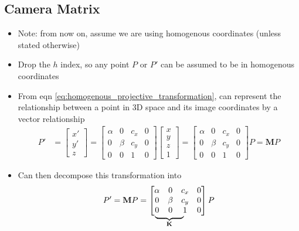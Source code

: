 \documentclass[letterpaper,12pt]{article}
\newcommand{\matr}[1]{\mathbf{#1}}
\newcommand\undermat[2]{%
  \makebox[0pt][l]{$\smash{\underbrace{\phantom{%
    \begin{matrix}#2\end{matrix}}}_{\text{$#1$}}}$}#2}
\begin{document}
\subsection{Camera Matrix}
\begin{itemize}
 \item Note: from now on, assume we are using homogenous coordinates (unless stated otherwise)
 \item Drop the $h$ index, so any point $P$ or $P'$ can be assumed to be in homogenous coordinates
 \item From eqn \ref{eq:homogenous_projective_transformation}, can represent the relationship between a point in 3D space and its image coordinates by a vector relationship
       \begin{align}
        P' & = \begin{bmatrix}
         x' \\
         y' \\
         z
        \end{bmatrix}
        = \begin{bmatrix}
         \alpha & 0     & c_x & 0 \\
         0      & \beta & c_y & 0 \\
         0      & 0     & 1   & 0
        \end{bmatrix}
        \begin{bmatrix}
         x \\
         y \\
         z \\
         1
        \end{bmatrix}
        = \begin{bmatrix}
         \alpha & 0     & c_x & 0 \\
         0      & \beta & c_y & 0 \\
         0      & 0     & 1   & 0
        \end{bmatrix} P
        = \matr{M} P
       \end{align}
 \item Can then decompose this transformation into
       \begin{align}
        P' = \matr{M} P
        =\begin{bmatrix}
         \alpha                & 0     & c_x & 0 \\
         0                     & \beta & c_y & 0 \\
         \undermat{\matr{K}}{0 & 0     & 1}  & 0
        \end{bmatrix}
        P

\end{align}
\end{itemize}
\end{document}
